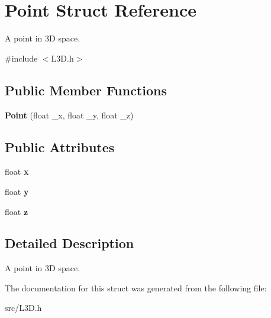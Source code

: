 \hypertarget{structPoint}{}\section{Point Struct Reference}
\label{structPoint}


A point in 3D space.  




{\ttfamily \#include $<$L3\+D.\+h$>$}

\subsection*{Public Member Functions}
\begin{DoxyCompactItemize}
\item 
\mbox{\label{structPoint_aef2feff94db53418730e802319eb4fe7}} 
{\bfseries Point} (float \+\_\+x, float \+\_\+y, float \+\_\+z)
\end{DoxyCompactItemize}
\subsection*{Public Attributes}
\begin{DoxyCompactItemize}
\item 
\mbox{\label{structPoint_a05dfe2dfbde813ad234b514f30e662f1}} 
float {\bfseries x}
\item 
\mbox{\label{structPoint_a6101960c8d2d4e8ea1d32c9234bbeb8d}} 
float {\bfseries y}
\item 
\mbox{\label{structPoint_a9a666531e0e99adff132be93d2407d0c}} 
float {\bfseries z}
\end{DoxyCompactItemize}


\subsection{Detailed Description}
A point in 3D space. 



The documentation for this struct was generated from the following file\+:\begin{DoxyCompactItemize}
\item 
src/L3\+D.\+h\end{DoxyCompactItemize}
